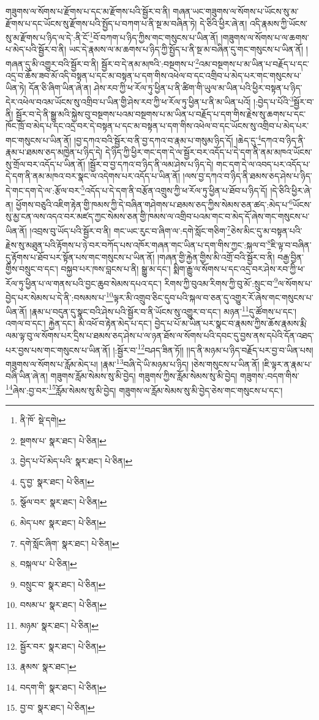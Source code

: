 གཟུགས་ལ་སོགས་པ་རྫོགས་པ་དང་མ་རྫོགས་པའི་སྦྱོར་བ་ནི། གཞན་ཡང་གཟུགས་ལ་སོགས་པ་ཡོངས་སུ་མ་རྫོགས་པ་དང་ཡོངས་སུ་རྫོགས་པའི་སྤྱོད་པ་བཀག་པ་ནི་སྔ་མ་བཞིན་ཏེ། དེ་ཅིའི་ཕྱིར་ཞེ་ན། འདི་རྣམས་ཀྱི་ཡོངས་སུ་མ་རྫོགས་པ་ཉིད་ལ་དེ་:ནི་ངོ་\footnote{ནི་ཁོ་  སྡེ་དགེ། }བོ་བཀག་པ་ཉིད་ཀྱིས་གང་གསུངས་པ་ཡིན་ནོ། །གཟུགས་ལ་སོགས་པ་ལ་ཆགས་པ་མེད་པའི་སྦྱོར་བ་ནི། ཡང་དེ་རྣམས་ལ་མ་ཆགས་པ་ཉིད་ཀྱི་སྤྱོད་པ་ནི་སྔ་མ་བཞིན་དུ་གང་གསུངས་པ་ཡིན་ནོ། །གཞན་དུ་མི་འགྱུར་བའི་སྦྱོར་བ་ནི། སྦྱོར་བ་དེ་ནམ་མཁའི་:བསྔགས་པ་\footnote{སྔགས་པ་  སྣར་ཐང་།  པེ་ཅིན། }འམ་བསྔགས་པ་མ་ཡིན་པ་བརྗོད་པ་དང་འདྲ་བ་ཆོས་ཟབ་མོ་འདི་བསྟན་པ་དང་མ་བསྟན་པ་དག་གིས་འཕེལ་བ་དང་འགྲིབ་པ་མེད་པར་གང་གསུངས་པ་ཡིན་ཏེ། དོན་ཅི་ཞིག་ཡིན་ཞེ་ན། ཤེས་རབ་ཀྱི་ཕ་རོལ་ཏུ་ཕྱིན་པ་ནི་ཚིག་གི་ཡུལ་མ་ཡིན་པའི་ཕྱིར་བསྟན་པ་ཉིད་དེར་འཕེལ་བའམ་ཡོངས་སུ་འགྲིབ་པ་ཡིན་གྱི་ཤེས་རབ་ཀྱི་ཕ་རོལ་ཏུ་ཕྱིན་པ་ནི་མ་ཡིན་པའོ། །:བྱེད་པ་པོའི་\footnote{བྱེད་པ་པོ་མེད་པའི་  སྣར་ཐང་།  པེ་ཅིན། }སྦྱོར་བ་ནི། སྦྱོར་བ་དེ་ནི་སྒྱུ་མའི་སྐྱེས་བུ་བསྔགས་པའམ་བསྔགས་པ་མ་ཡིན་པ་བརྗོད་པ་དག་གིས་རྗེས་སུ་ཆགས་པ་དང་ཁོང་ཁྲོ་བ་མེད་པ་དང་འདྲ་བར་དེ་བསྟན་པ་དང་མ་བསྟན་པ་དག་གིས་འཕེལ་བ་དང་ཡོངས་སུ་འགྲིབ་པ་མེད་པར་གང་གསུངས་པ་ཡིན་ནོ། །བྱ་དཀའ་བའི་སྦྱོར་བ་ནི་བྱ་དཀའ་བ་རྣམ་པ་གསུམ་ཉིད་དོ། །ཆེད་དུ་\footnote{དུ་བྱ་  སྣར་ཐང་།  པེ་ཅིན། }དཀའ་བ་ཉིད་ནི་རྣམ་པ་ཐམས་ཅད་མཁྱེན་པ་ཉིད་དེ། དེ་ཉིད་ཀྱི་ཕྱིར་གང་དག་དེ་ལ་སྦྱོར་བར་འདོད་པ་དེ་དག་ནི་ནམ་མཁའ་ཡོངས་སུ་གྲོལ་བར་འདོད་པ་ཡིན་ནོ། །སྦྱོར་བ་བྱ་དཀའ་བ་ཉིད་ནི་ལམ་ཤེས་པ་ཉིད་དེ། གང་དག་དེ་ལ་འབད་པར་འདོད་པ་དེ་དག་ནི་ནམ་མཁའ་བར་སྣང་ལ་འདེགས་པར་འདོད་པ་ཡིན་ནོ། །ལས་བྱ་དཀའ་བ་ཉིད་ནི་ཐམས་ཅད་ཤེས་པ་ཉིད་དེ་གང་དག་དེ་ལ་:རྩོལ་བར་\footnote{སྩོལ་བར་  སྣར་ཐང་།  པེ་ཅིན། }འདོད་པ་དེ་དག་ནི་བརྩོན་འགྲུས་ཀྱི་ཕ་རོལ་ཏུ་ཕྱིན་པ་ཐོབ་པ་ཉིད་དོ། །དེ་ཅིའི་ཕྱིར་ཞེ་ན། ཕྱོགས་བཅུའི་འཇིག་རྟེན་གྱི་ཁམས་ཀྱི་དེ་བཞིན་གཤེགས་པ་ཐམས་ཅད་ཀྱིས་སེམས་ཅན་ཚད་:མེད་པ་\footnote{མེད་པས་  སྣར་ཐང་།  པེ་ཅིན། }ཡོངས་སུ་མྱ་ངན་ལས་འདའ་བར་མཛད་ཀྱང་སེམས་ཅན་གྱི་ཁམས་ལ་འགྲིབ་པའམ་གང་བ་མེད་དོ་ཞེས་གང་གསུངས་པ་ཡིན་ནོ། །འབྲས་བུ་ཡོད་པའི་སྦྱོར་བ་ནི། གང་ཡང་རུང་བ་ཞིག་ལ་:དགེ་སློང་གཅིག་\footnote{དགེ་སློང་ཞིག་  སྣར་ཐང་།  པེ་ཅིན། }ཅེས་མིང་དུ་མ་བསྟན་པའི་རྗེས་སུ་མཐུན་པའི་རྟོགས་པ་ཉེ་བར་བཀོད་པས་འཁོར་གཞན་གང་ཡིན་པ་དག་གིས་ཀྱང་:སྐལ་བ་\footnote{བསྐལ་པ་  པེ་ཅིན། }ཇི་ལྟ་བ་བཞིན་དུ་རྟོགས་པ་ཐོབ་པར་སྟོན་པས་གང་གསུངས་པ་ཡིན་ནོ། །གཞན་གྱི་རྐྱེན་གྱིས་མི་འགྲོ་བའི་སྦྱོར་བ་ནི། བརྒྱ་བྱིན་གྱིས་བསྲུང་བ་དང་། བསྐྱབ་པར་ཁས་བླངས་པ་ནི། སྒྱུ་མ་དང་། སྨིག་རྒྱུ་ལ་སོགས་པ་དང་འདྲ་བར་ཤེས་རབ་ཀྱི་ཕ་རོལ་ཏུ་ཕྱིན་པ་ལ་གནས་པའི་བྱང་ཆུབ་སེམས་དཔའ་དང་། རིགས་ཀྱི་བུའམ་རིགས་ཀྱི་བུ་མོ་:སྲུང་བ་\footnote{བསྲུང་བ་  སྣར་ཐང་།  པེ་ཅིན། }ལ་སོགས་པ་བྱེད་པར་སེམས་པ་དེ་ནི་:བསམས་པ་\footnote{བསམ་པ་  སྣར་ཐང་།  པེ་ཅིན། }ལྟར་མི་འགྲུབ་ཅིང་དུབ་པའི་སྐལ་བ་ཅན་དུ་འགྱུར་རོ་ཞེས་གང་གསུངས་པ་ཡིན་ནོ། །རྣམ་པ་བདུན་དུ་སྣང་བའི་ཤེས་པའི་སྦྱོར་བ་ནི་ཡོངས་སུ་འགྱུར་བ་དང་། མཉན་\footnote{མཉམ་  སྣར་ཐང་།  པེ་ཅིན། }དུ་ཚོགས་པ་དང་། འགལ་བ་དང་། རྐྱེན་དང་། མི་འཕོ་བ་རྟེན་མེད་པ་དང་། བྱེད་པ་པོ་མ་ཡིན་པར་སྣང་བ་རྣམས་ཀྱིས་ཆོས་རྣམས་རྨི་ལམ་ལྟ་བུ་ལ་སོགས་པར་དྲིས་པ་ཐམས་ཅད་ཤེས་པ་ལ་ཉན་ཐོས་ལ་སོགས་པའི་དབང་དུ་བྱས་ནས་དཔེའི་དོན་འཐད་པར་བྱས་པས་གང་གསུངས་པ་ཡིན་ནོ། །:སྦྱོར་བ་\footnote{སྦྱོར་བར་  སྣར་ཐང་།  པེ་ཅིན། }བཤད་ཟིན་ཏོ།། །།ད་ནི་མཉམ་པ་ཉིད་བརྗོད་པར་བྱ་བ་ཡིན་པས། གཟུགས་ལ་སོགས་པ་རློམ་མེད་པ། །རྣམ་\footnote{རྣམས་  སྣར་ཐང་། }བཞི་དེ་ཡི་མཉམ་པ་ཉིད། །ཅེས་གསུངས་པ་ཡིན་ནོ། །ཇི་ལྟར་ན་རྣམ་པ་བཞི་ཡིན་ཞེ་ན། གཟུགས་རློམ་སེམས་སུ་མི་བྱེད། གཟུགས་ཀྱིས་རློམ་སེམས་སུ་མི་བྱེད། གཟུགས་:བདག་གིས་\footnote{བདག་གི་  སྣར་ཐང་།  པེ་ཅིན། }ཞེས་:བྱ་བར་\footnote{བྱ་བ་  སྣར་ཐང་།  པེ་ཅིན། }རློམ་སེམས་སུ་མི་བྱེད། གཟུགས་ལ་རློམ་སེམས་སུ་མི་བྱེད་ཅེས་གང་གསུངས་པ་དང་། 